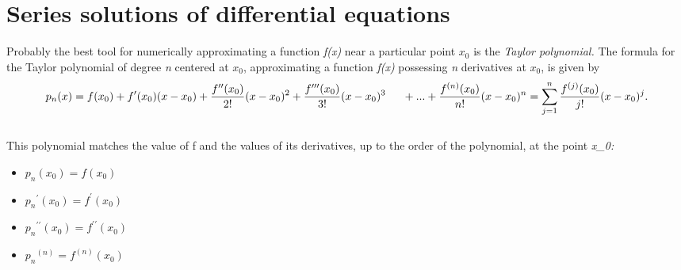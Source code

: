 \documentclass{article}
\begin{document}
\section{Series solutions of differential equations}

Probably the best tool for numerically approximating a function \textsl{f(x)} near a particular point \begin{math} x_0 \end{math} is the \textsl{Taylor polynomial.} The formula for the Taylor polynomial of degree \textsl{n} centered at \begin{math} x_0 \end{math}, approximating a function \textsl{f(x)} possessing \textsl{n} derivatives at \begin{math} x_0 \end{math}, is given by\\

\begin{equation*}
    p_n(x)=f(x_0) + f^{\prime}(x_0)(x-x_0)+\frac{f^{\prime\prime}(x_0)}{2!}(x-x_0)^2+\frac{f^{\prime\prime\prime}(x_0)}{3!}(x-x_0)^3\\ \\ \indent\setlength{\parindent}{9em} + ... + \frac{f^{(n)}(x_0)}{n!}(x-x_0)^n   = \sum\limits_{j=1}^n\frac{f^{(j)}(x_0)}{j!}(x-x_0)^j.
\end{equation*}\\

This polynomial matches the value of f and the values of its derivatives, up to the order of the polynomial, at the point \textsl{x_0:}\\
\begin{itemize}
\item \begin{math}
p_n(x_0) = f(x_0) \end{math}\\

\item \begin{math} {p_n}^{\prime}(x_0) = f^{\prime}(x_0) \end{math}\\

\item \begin{math} {p_n}^{\prime\prime}(x_0) = f^{\prime\prime}(x_0) \end{math}\\
\item \begin{math} {p_n}^{(n)}=f^{(n)}(x_0) \end{math} \\
\end{itemize}
\end{document}
